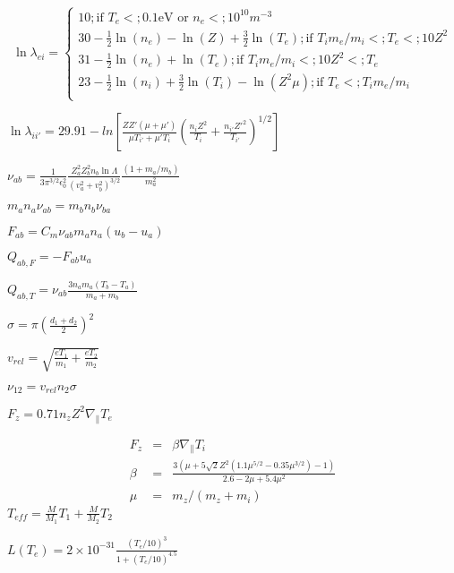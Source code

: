 \begin{equation}
\ln \lambda_{ei} = \left\{\begin{array}{ll} 10 ; \textrm{if } T_e <; 0.1 
\textrm{eV or } n_e <; 10^{10}m^{-3} \\ 30 - \frac{1}{2}\ln\left(n_e\right) - 
\ln(Z) + \frac{3}{2}\ln\left(T_e\right) ; \textrm{if } T_im_e/m_i <; T_e <; 
10Z^2 \\ 31 - \frac{1}{2}\ln\left(n_e\right) + \ln\left(T_e\right) ; \textrm{if 
} T_im_e/m_i <; 10Z^2 <; T_e \\ 23 - \frac{1}{2}\ln\left(n_i\right) + 
\frac{3}{2}\ln\left(T_i\right) - \ln\left(Z^2\mu\right) ; \textrm{if } T_e <; 
T_im_e/m_i \\ \end{array}\right.\end{equation}


$\ln \lambda_{ii'} = 29.91 - ln\left[\frac{ZZ'\left(\mu + \mu'\right)}{\mu 
T_{i'} + \mu'T_i}\left(\frac{n_iZ^2}{T_i} + \frac{n_{i'} 
Z'^2}{T_{i'}}\right)^{1/2}\right]$

$\nu_{ab} = \frac{1}{3\pi^{3/2}\epsilon_0^2}\frac{Z_a^2 Z_b^2 n_b 
\ln\Lambda}{\left(v_a^2 + v_b^2\right)^{3/2}}\frac{\left(1 + m_a / 
m_b\right)}{m_a^2}$

$m_a n_a \nu_{ab} = m_b n_b \nu_{ba}$

$F_{ab} = C_m \nu_{ab} m_a n_a \left( u_b - u_a \right)$

$Q_{ab,F} = - F_{ab} u_a$

$Q_{ab,T} = \nu_{ab}\frac{3n_a m_a\left(T_b - T_a\right)}{m_a + m_b}$

$\sigma = \pi \left(\frac{d_1 + d_2}{2}\right)^2$

$v_{rel} = \sqrt{\frac{eT_1}{m_1} + \frac{eT_2}{m_2}}$

$\nu_{12} = v_{rel} n_2 \sigma$

$F_z = 0.71 n_z Z^2 \nabla_{\|}T_e$

\begin{eqnarray}
 F_z &=& \beta \nabla_{\|}T_i \\ \beta &=& \frac{3\left(\mu + 
5\sqrt{2}Z^2\left(1.1\mu^{5/2} - 0.35\mu^{3/2}\right) - 1\right)}{2.6 - 2\mu + 
5.4\mu^2} \\ \mu &=& m_z / \left(m_z + m_i\right) \end{eqnarray}
$T_{eff} = \frac{M}{M_1}T_1 + \frac{M}{M_2}T_2$

$L\left(T_e\right) = 2\times 10^{-31} \frac{\left(T_e/10\right)^3}{1 + 
\left(T_e / 10\right)^{4.5}}$

